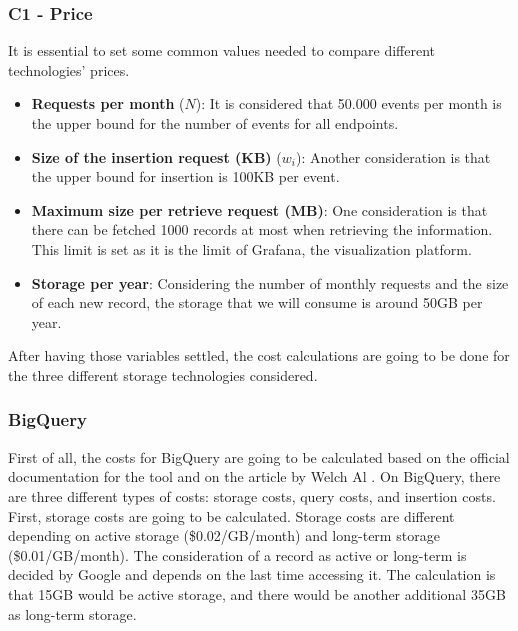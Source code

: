 \documentclass[english, 12pt, a4paper, sci, utf8, a-1b, online]{aaltothesis}
\begin{document}
\subsubsection*{C1 - Price}

It is essential to set some common values needed to compare different technologies' prices.

\begin{itemize}
    \item \textbf{Requests per month} ($N$): It is considered that 50.000 events per month is the upper bound for the number of events for all endpoints.
    \item \textbf{Size of the insertion request (KB)} ($w_i$): Another consideration is that the upper bound for insertion is 100KB per event.
    \item \textbf{Maximum size per retrieve request (MB)}: One consideration is that there can be fetched 1000 records at most when retrieving the information. This limit is set as it is the limit of Grafana, the visualization platform.
    \item \textbf{Storage per year}: Considering the number of monthly requests and the size of each new record, the storage that we will consume is around 50GB per year.
\end{itemize}

After having those variables settled, the cost calculations are going to be done for the three different storage technologies considered.

\subsubsection*{BigQuery}

First of all, the costs for BigQuery are going to be calculated based on the official documentation for the tool \cite{BigQueryDocsPricing} and on the article by Welch Al \cite{BigQueryCosts}. On BigQuery, there are three different types of costs: storage costs, query costs, and insertion costs.\\

First, storage costs are going to be calculated. Storage costs are different depending on active storage (\$0.02/GB/month) and long-term storage (\$0.01/GB/month). The consideration of a record as active or long-term is decided by Google and depends on the last time accessing it. The calculation is that 15GB would be active storage, and there would be another additional 35GB as long-term storage.
\end{document}
